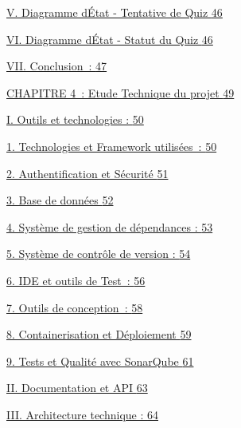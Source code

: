 \documentclass[12pt,a4paper,twoside]{report}
\begin{document}
\protect\hyperlink{diagramme-duxe9tat---tentative-de-quiz}{V. Diagramme
d\textquotesingle État - Tentative de Quiz
\protect\hyperlink{diagramme-duxe9tat---tentative-de-quiz}{46}}

\protect\hyperlink{diagramme-duxe9tat---statut-du-quiz}{VI. Diagramme
d\textquotesingle État - Statut du Quiz
\protect\hyperlink{diagramme-duxe9tat---statut-du-quiz}{46}}

\protect\hyperlink{conclusion-2}{VII. Conclusion~:
\protect\hyperlink{conclusion-2}{47}}

\protect\hyperlink{section-5}{CHAPITRE 4~: Etude Technique du projet
\protect\hyperlink{section-5}{49}}

\protect\hyperlink{outils-et-technologies}{I. Outils et technologies :
\protect\hyperlink{outils-et-technologies}{50}}

\protect\hyperlink{technologies-et-framework-utilisuxe9es}{1.
Technologies et Framework utilisées~:
\protect\hyperlink{technologies-et-framework-utilisuxe9es}{50}}

\protect\hyperlink{authentification-et-suxe9curituxe9}{2.
Authentification et Sécurité
\protect\hyperlink{authentification-et-suxe9curituxe9}{51}}

\protect\hyperlink{base-de-donnuxe9es}{3. Base de données
\protect\hyperlink{base-de-donnuxe9es}{52}}

\protect\hyperlink{_Toc204179721}{4. Système de gestion de dépendances :
\protect\hyperlink{systeme-gestion-dependances}{53}}

\protect\hyperlink{_Toc204179722}{5. Système de contrôle de version :
\protect\hyperlink{systeme-controle-version}{54}}

\protect\hyperlink{ide-et-outils-de-test}{6. IDE et outils de Test~:
\protect\hyperlink{ide-et-outils-de-test}{56}}

\protect\hyperlink{outils-de-conception}{7. Outils de conception~:
\protect\hyperlink{outils-de-conception}{58}}

\protect\hyperlink{containerisation-et-duxe9ploiement}{8.
Containerisation et Déploiement
\protect\hyperlink{containerisation-et-duxe9ploiement}{59}}

\protect\hyperlink{tests-et-qualituxe9-avec-sonarqube}{9. Tests et
Qualité avec SonarQube
\protect\hyperlink{tests-et-qualituxe9-avec-sonarqube}{61}}

\protect\hyperlink{documentation-et-api}{II. Documentation et API
\protect\hyperlink{documentation-et-api}{63}}

\protect\hyperlink{architecture-technique}{III. Architecture technique :
\protect\hyperlink{architecture-technique}{64}}
\end{document}
